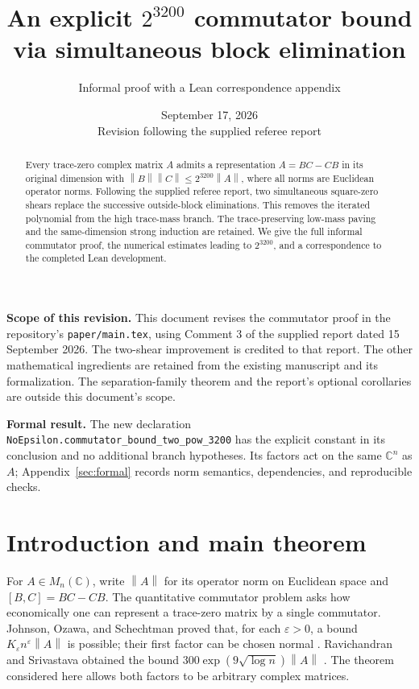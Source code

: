 \documentclass[11pt]{article}
\title{An explicit $2^{3200}$ commutator bound\\via simultaneous block elimination}
\author{Informal proof with a Lean correspondence appendix}
\date{September 17, 2026\\\small Revision following the supplied referee report}
\theoremstyle{remark}
\newcommand{\C}{\mathbb C}
\newcommand{\norm}[1]{\left\lVert#1\right\rVert}
\newcommand{\comm}[2]{[#1,#2]}
\numberwithin{equation}{section}
\begin{document}
\maketitle
\begin{abstract}
Every trace-zero complex matrix $A$ admits a representation $A=BC-CB$ in its
original dimension with $\norm B\norm C\le 2^{3200}\norm A$, where all norms
are Euclidean operator norms. Following the supplied referee report, two
simultaneous square-zero shears replace the successive outside-block eliminations.
This removes the iterated polynomial from the high trace-mass branch. The
trace-preserving low-mass paving and the same-dimension strong induction are
retained. We give the full informal commutator proof, the numerical estimates
leading to $2^{3200}$, and a correspondence to the completed Lean development.
\end{abstract}

\noindent\textbf{Scope of this revision.}
This document revises the commutator proof in the repository's
\texttt{paper/main.tex}, using Comment 3 of the supplied report dated
15 September 2026. The two-shear improvement is credited to that report. The other mathematical ingredients are retained from the existing
manuscript and its formalization. The separation-family theorem and the
report's optional corollaries are outside this document's scope.

\medskip
\noindent\textbf{Formal result.}
The new declaration
\texttt{NoEpsilon.commutator\_bound\_two\_pow\_3200}
has the explicit constant in its conclusion and no additional branch hypotheses.
Its factors act on the same $\C^n$ as $A$; Appendix~\ref{sec:formal} records
norm semantics, dependencies, and reproducible checks.

\tableofcontents
\clearpage

\section{Introduction and main theorem}
For $A\in M_n(\C)$, write $\norm A$ for its operator norm on Euclidean space and
$\comm BC=BC-CB$. The quantitative commutator problem asks how economically one
can represent a trace-zero matrix by a single commutator. Johnson, Ozawa, and
Schechtman proved that, for each $\varepsilon>0$, a bound
$K_\varepsilon n^\varepsilon\norm A$ is possible; their first factor can be chosen
normal \cite{JOS}. Ravichandran and Srivastava obtained the bound
$300\exp(9\sqrt{\log n})\norm A$ \cite[Corollary 2]{RS}. The theorem considered here
allows both factors to be arbitrary complex matrices.
\end{document}
